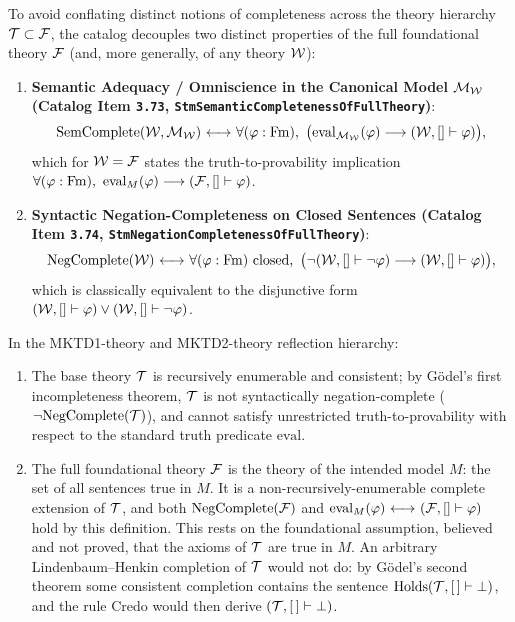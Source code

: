 To avoid conflating distinct notions of completeness across the theory hierarchy $\mathcal{T} \subset {\mathcal{F}}$, the catalog decouples two distinct properties of the full foundational theory ${\mathcal{F}}$ (and, more generally, of any theory ${\mathcal{W}}$):
\begin{enumerate}
  \item \textbf{Semantic Adequacy / Omniscience in the Canonical Model $\mathcal{M}_{{\mathcal{W}}}$ (Catalog Item \texttt{3.73}, \texttt{StmSemanticCompletenessOfFullTheory})}:
  \[
  \mathrm{SemComplete}({\mathcal{W}}, \mathcal{M}_{{\mathcal{W}}}) {\ \longleftrightarrow\ } \forall (\varphi:\mathrm{Fm}),\ \big(\mathrm{eval}_{\mathcal{M}_{{\mathcal{W}}}}(\varphi) \longrightarrow ({\mathcal{W}}, [] \vdash \varphi)\big),
  \]
  which for ${\mathcal{W}} = {\mathcal{F}}$ states the truth-to-provability implication $\forall (\phi:\Fm),\ \mathrm{eval}_M(\phi) \implies (\Fau, [] \vdash \phi)$.
  \item \textbf{Syntactic Negation-Completeness on Closed Sentences (Catalog Item \texttt{3.74}, \texttt{StmNegationCompletenessOfFullTheory})}:
  \[
  \mathrm{NegComplete}({\mathcal{W}}) {\ \longleftrightarrow\ } \forall (\varphi:\mathrm{Fm})\text{ closed},\ \big(\neg({\mathcal{W}}, [] \vdash \neg \varphi) \longrightarrow ({\mathcal{W}}, [] \vdash \varphi)\big),
  \]
  which is classically equivalent to the disjunctive form $({\mathcal{W}}, [] \vdash \varphi) \lor ({\mathcal{W}}, [] \vdash \neg \varphi)$.
\end{enumerate}

\begin{proposition}
\label{prop:tau_vs_fau_completeness}
In the \textsf{MKTD1-theory} and \textsf{MKTD2-theory} reflection hierarchy:
\begin{enumerate}
  \item The base theory $\mathcal{T}$ is recursively enumerable and consistent; by G\"odel's first incompleteness theorem, $\mathcal{T}$ is not syntactically negation-complete ($\neg \mathrm{NegComplete}(\mathcal{T})$), and cannot satisfy unrestricted truth-to-provability with respect to the standard truth predicate $\mathrm{eval}$.
  \item The full foundational theory ${\mathcal{F}}$ is the theory of the intended model $M$: the set of all sentences true in $M$. It is a non-recursively-enumerable complete extension of $\mathcal{T}$, and both $\mathrm{NegComplete}({\mathcal{F}})$ and $\mathrm{eval}_{M}(\varphi) {\ \longleftrightarrow\ } ({\mathcal{F}}, [] \vdash \varphi)$ hold by this definition. This rests on the foundational assumption, believed and not proved, that the axioms of $\mathcal{T}$ are true in $M$. An arbitrary Lindenbaum--Henkin completion of $\mathcal{T}$ would not do: by G\"odel's second theorem some consistent completion contains the sentence $\mathrm{Holds}(\mathcal{T},[\,]\vdash\bot)$, and the rule Credo would then derive $(\mathcal{T},[\,]\vdash\bot)$.
\end{enumerate}
\end{proposition}



\pagebreak



\pagebreak


